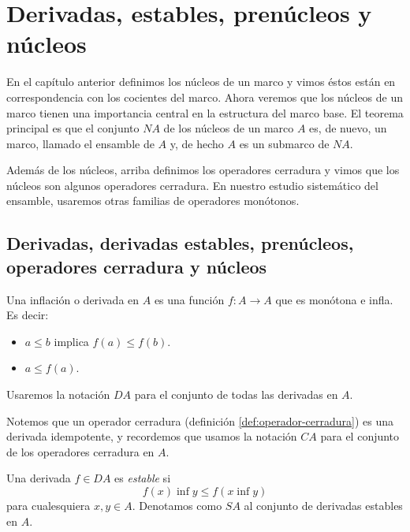 \chapter{Derivadas, estables, prenúcleos y núcleos}


En el capítulo anterior definimos los núcleos de un marco y vimos
éstos están en correspondencia con los cocientes del marco.
Ahora veremos que los núcleos de un marco tienen una importancia
central en la estructura del marco base.
El teorema principal es que el conjunto $NA$ de los núcleos de un
marco $A$ es, de nuevo, un marco, llamado el
ensamble de $A$ y, de hecho $A$ es un submarco de $NA$.

Además de los núcleos, arriba definimos los operadores cerradura
y vimos que los núcleos son algunos operadores cerradura.
En nuestro estudio sistemático del ensamble, usaremos otras
familias de operadores monótonos.

\section{Derivadas, derivadas estables, prenúcleos, operadores cerradura y núcleos}

\begin{defn}[Derivadas]
  Una inflación o derivada en $A$ es una función $f:A\to A$ que
  es monótona e infla.
  Es decir:
  \begin{itemize}
    \item $a\leq b$ implica $f(a) \leq f(b)$.
    \item $a\leq f(a)$.
  \end{itemize}
  Usaremos la notación $DA$ para el conjunto de todas las
  derivadas en $A$.
\end{defn}
Notemos que un operador cerradura (definición
\ref{def:operador-cerradura}) es una derivada idempotente, y
recordemos que usamos la notación $CA$ para el conjunto de los 
operadores cerradura en $A$.

\begin{defn}
  Una derivada $f\in DA$ es \emph{estable} si
  \[
    f(x)\inf y \leq f(x\inf y)
  \]
  para cualesquiera $x,y\in A$.
  Denotamos como $SA$ al conjunto de derivadas estables en $A$.
\end{defn}

